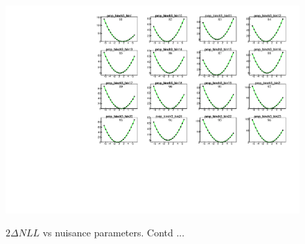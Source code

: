 \begin{figure}
    \centering  
    {\includegraphics[width=1.0\linewidth]{Image/MLFit/ScanNuis/scanNuis6.pdf}}
    \caption{  $2\Delta NLL$ vs nuisance parameters. Contd ...}
    \label{fig:nuisScan6}
\end{figure}

